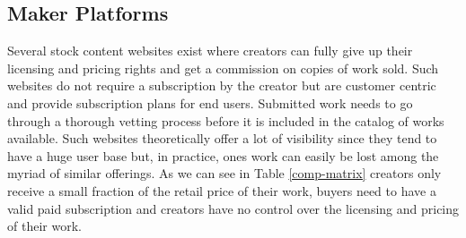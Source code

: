 \subsection{Maker Platforms}

Several stock content websites exist where creators can fully give up their licensing and pricing rights and get a commission on copies of work sold. Such websites do not require a subscription by the creator but are customer centric and provide subscription plans for end users. Submitted work needs to go through a thorough vetting process before it is included in the catalog of works available. Such websites theoretically offer a lot of visibility since they tend to have a huge user base but, in practice, ones work can easily be lost among the myriad of similar offerings. As we can see in Table \ref{comp-matrix} creators only receive a small fraction of the retail price of their work, buyers need to have a valid paid subscription and creators have no control over the licensing and pricing of their work.


